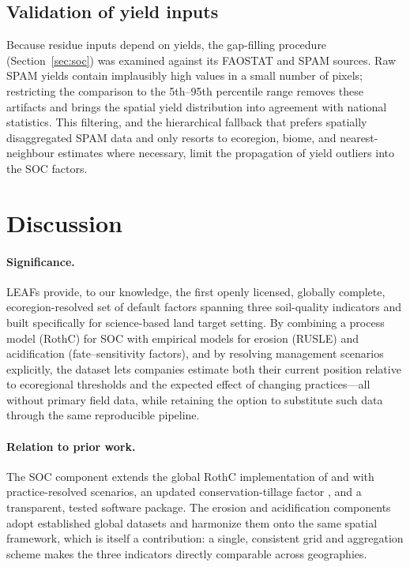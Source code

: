 \documentclass[11pt]{article}
\begin{document}
\subsection{Validation of yield inputs}
Because residue inputs depend on yields, the gap-filling procedure
(Section~\ref{sec:soc}) was examined against its FAOSTAT and SPAM sources. Raw SPAM
yields contain implausibly high values in a small number of pixels; restricting the
comparison to the 5th--95th percentile range removes these artifacts and brings the
spatial yield distribution into agreement with national statistics. This filtering, and
the hierarchical fallback that prefers spatially disaggregated SPAM data and only resorts
to ecoregion, biome, and nearest-neighbour estimates where necessary, limit the
propagation of yield outliers into the SOC factors.

\section{Discussion}
\label{sec:discussion}

\paragraph{Significance.} LEAFs provide, to our knowledge, the first openly licensed,
globally complete, ecoregion-resolved set of default factors spanning three soil-quality
indicators and built specifically for science-based land target setting. By combining a
process model (RothC) for SOC with empirical models for erosion (RUSLE) and acidification
(fate--sensitivity factors), and by resolving management scenarios explicitly, the
dataset lets companies estimate both their current position relative to ecoregional
thresholds and the expected effect of changing practices---all without primary field
data, while retaining the option to substitute such data through the same reproducible
pipeline.

\paragraph{Relation to prior work.} The SOC component extends the global RothC
implementation of \citet{morais2019} and \citet{teixeira2021} with practice-resolved
scenarios, an updated conservation-tillage factor \citep{hyun2024}, and a transparent,
tested software package. The erosion and acidification components adopt established
global datasets \citep{borrelli2017,panagos2015,roy2014} and harmonize them onto the same
spatial framework, which is itself a contribution: a single, consistent grid and
aggregation scheme makes the three indicators directly comparable across geographies.
\end{document}
